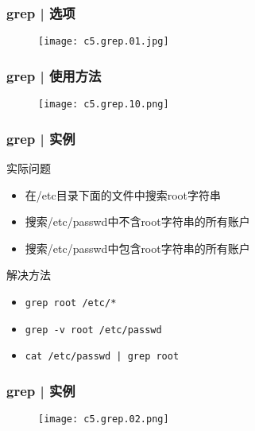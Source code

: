 \begin{frame}
  \frametitle{grep | \alert{选项}}
  \begin{figure}
    \centering
    \texttt{[image: c5.grep.01.jpg]}
  \end{figure}
\end{frame}

\begin{frame}
  \frametitle{grep | 使用方法}
  \begin{figure}
    \centering
    \texttt{[image: c5.grep.10.png]}
  \end{figure}
\end{frame}


\begin{frame}[fragile]
  \frametitle{grep | \alert{实例}}
  \begin{block}{实际问题}
    \begin{itemize}
      \item<2-> 在/etc目录下面的文件中搜索root字符串
      \item<4-> 搜索/etc/passwd中不含root字符串的所有账户
      \item<6-> 搜索/etc/passwd中包含root字符串的所有账户
    \end{itemize}
  \end{block}
  \begin{block}{解决方法}
    \begin{itemize}
      \item<3-> \verb|grep root /etc/*|
      \item<5-> \verb|grep -v root /etc/passwd|
      \item<7-> \verb=cat /etc/passwd | grep root=
    \end{itemize}
  \end{block}
\end{frame}

\begin{frame}
  \frametitle{grep | 实例}
  \begin{figure}
    \centering
    \texttt{[image: c5.grep.02.png]}
  \end{figure}
\end{frame}

